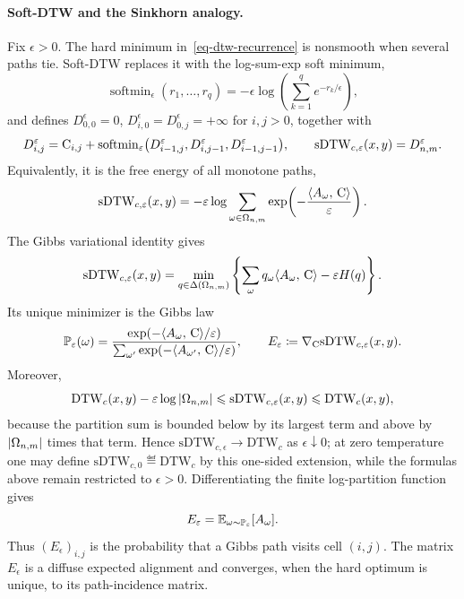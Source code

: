 \paragraph{Soft-DTW and the Sinkhorn analogy.}
Fix $\epsilon>0$. The hard minimum in~\eqref{eq-dtw-recurrence} is nonsmooth when several paths tie. Soft-DTW replaces it with the log-sum-exp soft minimum,
\begin{equation}\label{eq-dtw-softmin}
\operatorname{softmin}_\epsilon(r_1,\ldots,r_q)
=
-\epsilon\log\!\left(\sum_{k=1}^q e^{-r_k/\epsilon}\right),
\end{equation}
and defines $D_{0,0}^\epsilon=0$, $D_{i,0}^\epsilon=D_{0,j}^\epsilon=+\infty$ for $i,j>0$, together with
\begin{equation}\label{eq-soft-dtw-recurrence}
D_{i,j}^\varepsilon
=
\mathrm{C}_{i,j}
+
\operatorname{softmin}_\varepsilon
\bigl(D_{i-1,j}^\varepsilon,D_{i,j-1}^\varepsilon,D_{i-1,j-1}^\varepsilon\bigr),
\qquad
\mathrm{sDTW}_{c,\varepsilon}(x,y)=D_{n,m}^\varepsilon.
\end{equation}
Equivalently, it is the free energy of all monotone paths,
\begin{equation}\label{eq-soft-dtw-partition}
\mathrm{sDTW}_{c,\varepsilon}(x,y)
=
-\varepsilon\log
\sum_{\omega\in\Omega_{n,m}}
\exp\!\left(-\frac{\langle A_\omega,\,\mathrm{C}\rangle}{\varepsilon}\right).
\end{equation}
The Gibbs variational identity gives
\begin{equation}\label{eq-soft-dtw-variational}
\mathrm{sDTW}_{c,\varepsilon}(x,y)
=
\min_{q\in\Delta(\Omega_{n,m})}
\left\{
\sum_{\omega}q_\omega\langle A_\omega,\,\mathrm{C}\rangle
-\varepsilon H(q)
\right\}.
\end{equation}
Its unique minimizer is the Gibbs law
\begin{equation}\label{eq-soft-dtw-gibbs-law}
\mathbb{P}_\varepsilon(\omega)
=
\frac{\exp(-\langle A_\omega,\,\mathrm{C}\rangle/\varepsilon)}
{\sum_{\omega'}\exp(-\langle A_{\omega'},\,\mathrm{C}\rangle/\varepsilon)},
\qquad
E_\varepsilon
\coloneqq
\nabla_{\mathrm{C}}\mathrm{sDTW}_{c,\varepsilon}(x,y).
\end{equation}
Moreover,
\begin{equation}\label{eq-soft-dtw-zero-temperature-bound}
\mathrm{DTW}_c(x,y)-\varepsilon\log\left\lvert\Omega_{n,m}\right\rvert
\leqslant
\mathrm{sDTW}_{c,\varepsilon}(x,y)
\leqslant
\mathrm{DTW}_c(x,y),
\end{equation}
because the partition sum is bounded below by its largest term and above by $\left\lvert\Omega_{n,m}\right\rvert$ times that term. Hence $\mathrm{sDTW}_{c,\epsilon}\to\mathrm{DTW}_c$ as $\epsilon\downarrow0$; at zero temperature one may define $\mathrm{sDTW}_{c,0}\eqdef\mathrm{DTW}_c$ by this one-sided extension, while the formulas above remain restricted to $\epsilon>0$. Differentiating the finite log-partition function gives
\begin{equation}\label{eq-soft-dtw-expected-alignment}
E_\varepsilon
=
\mathbb{E}_{\omega\sim\mathbb{P}_\varepsilon}[A_\omega].
\end{equation}
Thus $(E_\epsilon)_{i,j}$ is the probability that a Gibbs path visits cell $(i,j)$. The matrix $E_\epsilon$ is a diffuse expected alignment and converges, when the hard optimum is unique, to its path-incidence matrix.

